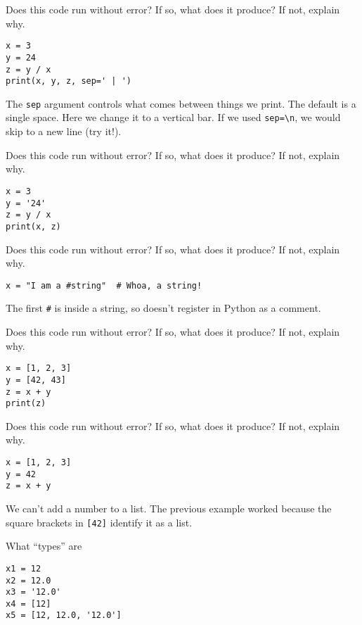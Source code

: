 \documentclass[11pt]{exam}
\begin{document}
\begin{questions}
\item Does this code run without error?  If so, what does it produce?  If not, explain why.
\begin{verbatim}
x = 3
y = 24
z = y / x
print(x, y, z, sep=' | ')
\end{verbatim}

\begin{solution}
The {\tt sep} argument controls what comes between things we print.  The default is a single space.
Here we change it to a vertical bar.
If we used \verb|sep=\n|, we would skip to a new line (try it!).
\end{solution}


\item Does this code run without error?  If so, what does it produce?  If not, explain why.
\begin{verbatim}
x = 3
y = '24'
z = y / x
print(x, z)
\end{verbatim}

\item Does this code run without error?  If so, what does it produce?  If not, explain why.
\begin{verbatim}
x = "I am a #string"  # Whoa, a string!
\end{verbatim}

\begin{solution}
The first \verb$#$ is inside a string, so doesn't register in Python as a comment.
\end{solution}

\item Does this code run without error?  If so, what does it produce?  If not, explain why.
\begin{verbatim}
x = [1, 2, 3]
y = [42, 43]
z = x + y
print(z)
\end{verbatim}

\item Does this code run without error?  If so, what does it produce?  If not, explain why.
\begin{verbatim}
x = [1, 2, 3]
y = 42
z = x + y
\end{verbatim}

\begin{solution}
We can't add a number to a list.  The previous example worked because the square brackets in
\verb$[42]$ identify it as a list.
\end{solution}

\item What ``types'' are
\begin{verbatim}
x1 = 12
x2 = 12.0
x3 = '12.0'
x4 = [12]
x5 = [12, 12.0, '12.0']
\end{verbatim}


\end{questions}
\end{document}
